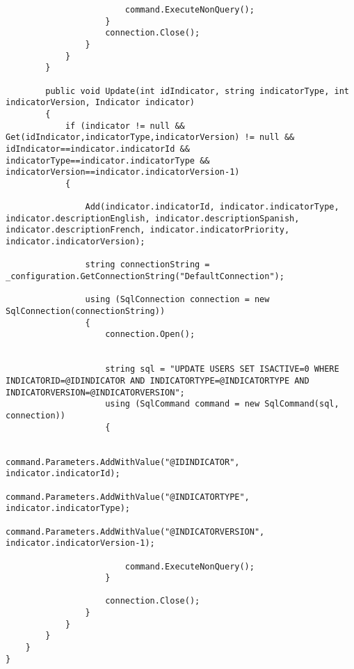 \begin{itemize}
\begin{itemize}
\begin{lstlisting}
                        command.ExecuteNonQuery();
                    }
                    connection.Close();
                }
            }
        }

        public void Update(int idIndicator, string indicatorType, int indicatorVersion, Indicator indicator)
        {
            if (indicator != null && Get(idIndicator,indicatorType,indicatorVersion) != null && idIndicator==indicator.indicatorId && indicatorType==indicator.indicatorType && indicatorVersion==indicator.indicatorVersion-1) 
            {

                Add(indicator.indicatorId, indicator.indicatorType, indicator.descriptionEnglish, indicator.descriptionSpanish, indicator.descriptionFrench, indicator.indicatorPriority, indicator.indicatorVersion);

                string connectionString = _configuration.GetConnectionString("DefaultConnection");

                using (SqlConnection connection = new SqlConnection(connectionString))
                {
                    connection.Open();


                    string sql = "UPDATE USERS SET ISACTIVE=0 WHERE INDICATORID=@IDINDICATOR AND INDICATORTYPE=@INDICATORTYPE AND INDICATORVERSION=@INDICATORVERSION"; 
                    using (SqlCommand command = new SqlCommand(sql, connection))
                    {

                        command.Parameters.AddWithValue("@IDINDICATOR", indicator.indicatorId);
                        command.Parameters.AddWithValue("@INDICATORTYPE", indicator.indicatorType);
                        command.Parameters.AddWithValue("@INDICATORVERSION", indicator.indicatorVersion-1);

                        command.ExecuteNonQuery();
                    }

                    connection.Close();
                }
            }
        }
    }
}


\end{lstlisting}
\end{itemize}
\end{itemize}
